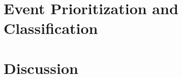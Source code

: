 \documentclass[a4paper,fleqn,usenatbib]{mnras}
\begin{document}

\section{Event Prioritization and Classification}
\label{sec:event_classify}


\section{Discussion}
\label{sec:discuss}

\end{document}
